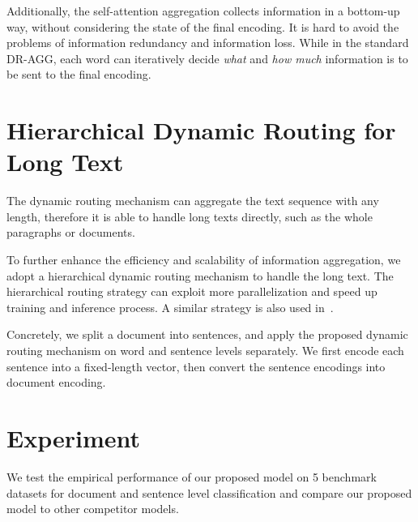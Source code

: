 \documentclass[11pt]{article}
\begin{document}
Additionally, the self-attention aggregation collects information in a bottom-up way, without considering the state of the final encoding. It is hard to avoid the problems of information redundancy and information loss.
While in the standard DR-AGG, each word can iteratively decide \textit{what} and \textit{how much} information is to be sent to the final encoding.


\section{Hierarchical Dynamic Routing for Long Text}

The dynamic routing mechanism can aggregate the text sequence with any length, therefore it is able to handle long texts directly, such as the whole paragraphs or documents.

To further enhance the efficiency and scalability of information aggregation, we adopt a hierarchical dynamic routing mechanism to handle the long text. The hierarchical routing strategy can exploit more parallelization and speed up training and inference process. A similar strategy is also used in~\cite{yang2016hierarchical}.

Concretely, we split a document into sentences, and apply the proposed dynamic routing mechanism on word and sentence levels separately. We first encode each sentence into a fixed-length vector, then convert the sentence encodings into document encoding.





\section{Experiment}
We test the empirical performance of our proposed model on 5 benchmark datasets for document and sentence level classification and compare our proposed model to other competitor models.
\end{document}
